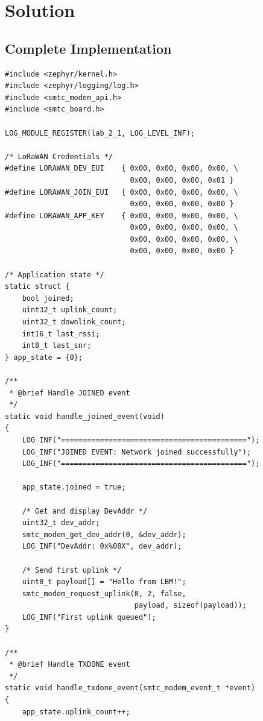 \documentclass[11pt,a4paper]{article}
\begin{document}
\section{Solution}

\begin{solutionbox}

\subsection{Complete Implementation}

\begin{lstlisting}
#include <zephyr/kernel.h>
#include <zephyr/logging/log.h>
#include <smtc_modem_api.h>
#include <smtc_board.h>

LOG_MODULE_REGISTER(lab_2_1, LOG_LEVEL_INF);

/* LoRaWAN Credentials */
#define LORAWAN_DEV_EUI    { 0x00, 0x00, 0x00, 0x00, \
                             0x00, 0x00, 0x00, 0x01 }
#define LORAWAN_JOIN_EUI   { 0x00, 0x00, 0x00, 0x00, \
                             0x00, 0x00, 0x00, 0x00 }
#define LORAWAN_APP_KEY    { 0x00, 0x00, 0x00, 0x00, \
                             0x00, 0x00, 0x00, 0x00, \
                             0x00, 0x00, 0x00, 0x00, \
                             0x00, 0x00, 0x00, 0x00 }

/* Application state */
static struct {
    bool joined;
    uint32_t uplink_count;
    uint32_t downlink_count;
    int16_t last_rssi;
    int8_t last_snr;
} app_state = {0};

/**
 * @brief Handle JOINED event
 */
static void handle_joined_event(void)
{
    LOG_INF("===========================================");
    LOG_INF("JOINED EVENT: Network joined successfully");
    LOG_INF("===========================================");

    app_state.joined = true;

    /* Get and display DevAddr */
    uint32_t dev_addr;
    smtc_modem_get_dev_addr(0, &dev_addr);
    LOG_INF("DevAddr: 0x%08X", dev_addr);

    /* Send first uplink */
    uint8_t payload[] = "Hello from LBM!";
    smtc_modem_request_uplink(0, 2, false,
                              payload, sizeof(payload));
    LOG_INF("First uplink queued");
}

/**
 * @brief Handle TXDONE event
 */
static void handle_txdone_event(smtc_modem_event_t *event)
{
    app_state.uplink_count++;


\end{lstlisting}
\end{solutionbox}
\end{document}
